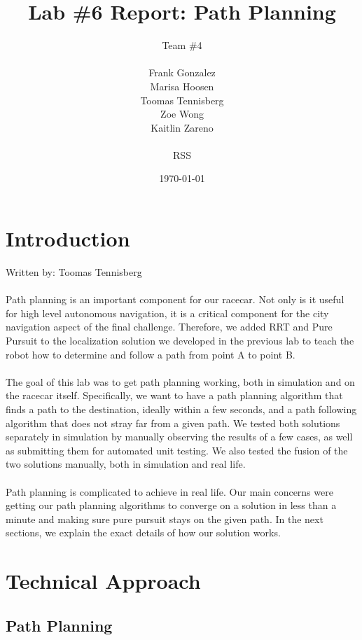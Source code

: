 \documentclass{article}
\title{Lab \#6 Report: Path Planning} %
\author{Team \#4 \\\\ Frank Gonzalez \\ Marisa Hoosen \\ Toomas Tennisberg \\ Zoe Wong \\ Kaitlin Zareno \\\\ RSS} %
\date{\today} %
\begin{document}
\maketitle

\section{Introduction}
Written by: Toomas Tennisberg\\\\
Path planning is an important component for our racecar. Not only is it useful for high level autonomous navigation, it is a critical component for the city navigation aspect of the final challenge. Therefore, we added RRT and Pure Pursuit to the localization solution we developed in the previous lab to teach the robot how to determine and follow a path from point A to point B.\\\\
The goal of this lab was to get path planning working, both in simulation and on the racecar itself. Specifically, we want to have a path planning algorithm that finds a path to the destination, ideally within a few seconds, and a path following algorithm that does not stray far from a given path. We tested both solutions separately in simulation by manually observing the results of a few cases, as well as submitting them for automated unit testing. We also tested the fusion of the two solutions manually, both in simulation and real life.\\\\
Path planning is complicated to achieve in real life. Our main concerns were getting our path planning algorithms to converge on a solution in less than a minute and making sure pure pursuit stays on the given path. In the next sections, we explain the exact details of how our solution works.

\section{Technical Approach}

\subsection{Path Planning}
\end{document}
